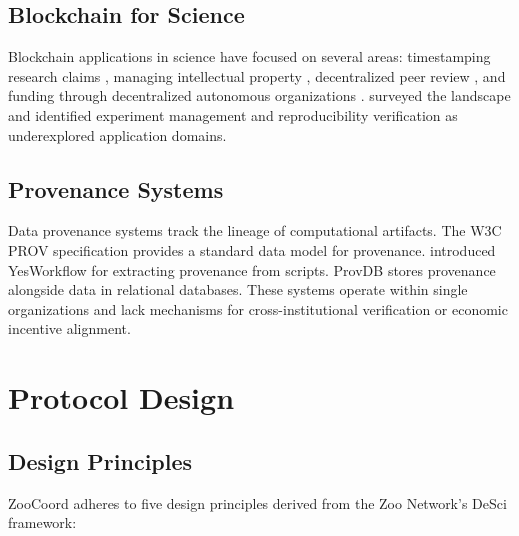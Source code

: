 \documentclass[11pt,a4paper]{article}
\begin{document}
\subsection{Blockchain for Science}

Blockchain applications in science have focused on several areas: timestamping research claims \citep{koepsell2020blockchain}, managing intellectual property \citep{hasan2019blockchain}, decentralized peer review \citep{tenorio2019open}, and funding through decentralized autonomous organizations \citep{wright2021desci}.
\citet{bartling2020blockchain} surveyed the landscape and identified experiment management and reproducibility verification as underexplored application domains.

\subsection{Provenance Systems}

Data provenance systems track the lineage of computational artifacts.
The W3C PROV specification \citep{moreau2013prov} provides a standard data model for provenance.
\citet{mcphillips2015yesworkflow} introduced YesWorkflow for extracting provenance from scripts.
ProvDB \citep{miao2018provdb} stores provenance alongside data in relational databases.
These systems operate within single organizations and lack mechanisms for cross-institutional verification or economic incentive alignment.

\section{Protocol Design}
\label{sec:protocol}

\subsection{Design Principles}

ZooCoord adheres to five design principles derived from the Zoo Network's DeSci framework:
\end{document}
